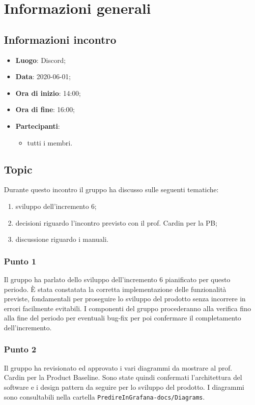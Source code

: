 \section{Informazioni generali}
\subsection{Informazioni incontro}
\begin{itemize}
\item \textbf{Luogo}: Discord;
\item \textbf{Data}: 2020-06-01;
\item \textbf{Ora di inizio}: 14:00;
\item \textbf{Ora di fine}: 16:00;
\item \textbf{Partecipanti}:
	\begin{itemize}
		\item tutti i membri.
	\end{itemize}
\end{itemize}

\subsection{Topic}
Durante questo incontro il gruppo ha discusso sulle seguenti tematiche:
\begin{enumerate}
\item sviluppo dell'incremento 6;
\item decisioni riguardo l'incontro previsto con il prof. Cardin per la PB;
\item discussione riguardo i manuali.
\end{enumerate}

\subsubsection{Punto 1}
Il gruppo ha parlato dello sviluppo dell’incremento 6 pianificato per questo periodo. È stata constatata la corretta implementazione delle funzionalità previste, fondamentali per proseguire lo sviluppo del prodotto senza incorrere in errori facilmente evitabili.
I componenti del gruppo procederanno alla verifica fino alla
fine del periodo per eventuali bug-fix per poi confermare il completamento dell’incremento.

\subsubsection{Punto 2}
Il gruppo ha revisionato ed approvato i vari diagrammi da mostrare al prof. Cardin per la Product Baseline. Sono state quindi confermati l'architettura del software e i design pattern da seguire per lo sviluppo del prodotto. I diagrammi sono consultabili nella cartella \texttt{PredireInGrafana-docs/Diagrams}.

